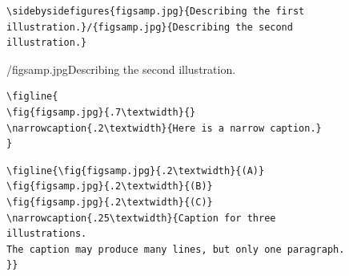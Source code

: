 \documentclass[reprint]{JASA}
\begin{document}
\begin{figure}
\baselineskip=12pt
\begin{verbatim}
\sidebysidefigures{figsamp.jpg}{Describing the first
illustration.}/{figsamp.jpg}{Describing the second illustration.}
\end{verbatim}

/{figsamp.jpg}{Describing the second illustration.}
\end{figure}


\begin{figure}
\baselineskip=12pt
\begin{verbatim}
\figline{
\fig{figsamp.jpg}{.7\textwidth}{}
\narrowcaption{.2\textwidth}{Here is a narrow caption.}
}
\end{verbatim}
\end{figure}


\begin{figure}
\baselineskip=12pt
\begin{verbatim}
\figline{\fig{figsamp.jpg}{.2\textwidth}{(A)}
\fig{figsamp.jpg}{.2\textwidth}{(B)}
\fig{figsamp.jpg}{.2\textwidth}{(C)}
\narrowcaption{.25\textwidth}{Caption for three illustrations. 
The caption may produce many lines, but only one paragraph.
}}
\end{verbatim}
\end{figure}
\end{document}
